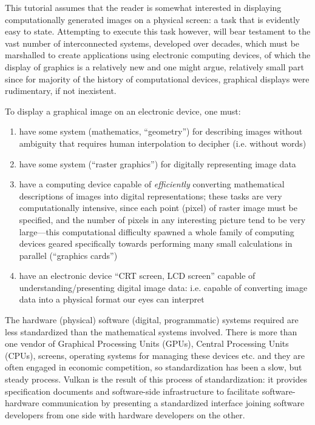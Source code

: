 \documentclass[12pt,letterpaper]{article}
\newcommand{\inquotes}[1]{``#1''}	%
\begin{document}
This tutorial assumes that the reader is somewhat interested in displaying computationally generated images on a physical screen: a task that is evidently easy to state. Attempting to execute this task however, will bear testament to the vast number of interconnected systems, developed over decades, which must be marshalled to create applications using electronic computing devices, of which the display of graphics is a relatively new and one might argue, relatively small part since for majority of the history of computational devices, graphical displays were rudimentary, if not inexistent. 

To display a graphical image on an electronic device, one must:
    \begin{enumerate}
        \item have some system (mathematics, \inquotes{geometry}) for describing images without ambiguity that requires human interpolation to decipher (i.e. without words)
        
        \item have some system (\inquotes{raster graphics}) for digitally representing image data
        
        \item have a computing device capable of \emph{efficiently} converting mathematical descriptions of images into digital representations; these tasks are very computationally intensive, since each point (pixel) of raster image must be specified, and the number of pixels in any interesting picture tend to be very large---this computational difficulty spawned a whole family of computing devices geared specifically towards performing many small calculations in parallel (\inquotes{graphics cards})
        
        \item have an electronic device \inquotes{CRT screen, LCD screen} capable of understanding/presenting digital image data: i.e. capable of converting image data into a physical format our eyes can interpret
    \end{enumerate}

The hardware (physical) software (digital, programmatic) systems required are less standardized than the mathematical systems involved. There is more than one vendor of Graphical Processing Units (GPUs), Central Processing Units (CPUs), screens, operating systems for managing these devices etc. and they are often engaged in economic competition, so standardization has been a slow, but steady process. Vulkan is the result of this process of standardization: it provides specification documents and software-side infrastructure to facilitate software-hardware communication by presenting a standardized interface joining software developers from one side with hardware developers on the other. 
\end{document}
